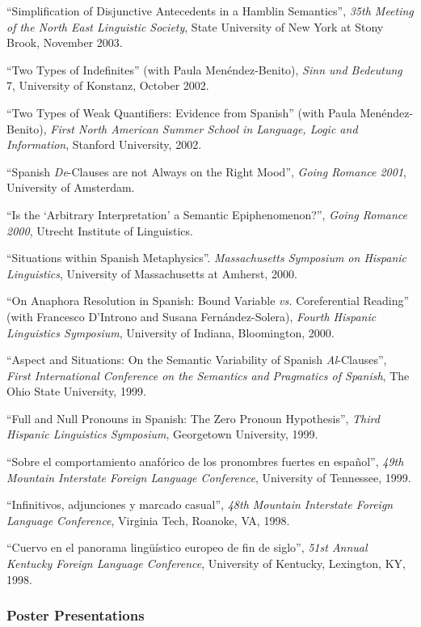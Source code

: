 \documentclass[11pt]{article}
\begin{document}
``Simplification of Disjunctive Antecedents in a Hamblin Semantics'', \textit{35th
  Meeting of the North East Linguistic Society}, State University of New York at Stony Brook, November 2003. 

``Two Types of Indefinites'' (with Paula Men\'endez-Benito), \textit{Sinn und Bedeutung} 7, University of Konstanz, October 2002. 

``Two Types of Weak Quantifiers: Evidence from Spanish'' (with Paula Men\'endez-Benito), \textit{First North American Summer School in Language, Logic and Information}, Stanford University, 2002. 

``Spanish \textit{De}-Clauses are not Always on the Right Mood'', \textit{Going Romance 2001}, University of Amsterdam. 

``Is the `Arbitrary Interpretation' a Semantic Epiphenomenon?'', \textit{Going Romance 2000}, Utrecht Institute of Linguistics.

``Situations within Spanish Metaphysics''. \textit{Massachusetts Symposium on Hispanic Linguistics}, University of Massachusetts at Amherst, 2000. 

``On Anaphora Resolution in Spanish: Bound Variable \textit{vs.} Coreferential Reading'' (with Francesco D'Introno and Susana Fern\'andez-Solera), \textit{Fourth Hispanic Linguistics Symposium}, University of Indiana, Bloomington, 2000. 

``Aspect and Situations: On the Semantic Variability of Spanish \textit{Al}-Clauses'', \textit{First International Conference on the Semantics and Pragmatics of Spanish}, The Ohio State University, 1999. 

``Full and Null Pronouns in Spanish: The Zero Pronoun Hypothesis'', \textit{Third Hispanic Linguistics Symposium}, Georgetown University, 1999. 

``Sobre el comportamiento anaf\'orico de los pronombres fuertes en espa\~nol'', \textit{49th Mountain Interstate Foreign Language Conference}, University of Tennessee, 1999. 

``Infinitivos, adjunciones y marcado casual'', \textit{48th Mountain Interstate Foreign Language Conference}, Virginia Tech, Roanoke, VA, 1998. 

``Cuervo en el panorama ling\"{u}\'istico europeo de fin de siglo'', \textit{51st Annual Kentucky Foreign Language Conference}, University of Kentucky, Lexington, KY, 1998. 

\subsubsection*{Poster Presentations}
\end{document}
